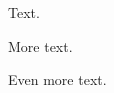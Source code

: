 \documentclass{article}
\begin{document}
\noindent Text.
\begin{code}%
\>[2][@{}l@{\AgdaIndent{1}}]%
\>[4]\AgdaSpace{}%
\AgdaSpace{}%
\AgdaSymbol{:}\AgdaSpace{}%
\<%
\end{code}
More text.
\begin{AgdaMultiCode}{2}
\begin{code}%
%
\>[2]\<%
\end{code}
\begin{code}%
\>[2][@{}l@{\AgdaIndent{1}}]%
\>[4]\AgdaSpace{}%
\AgdaSpace{}%
\AgdaSymbol{:}\AgdaSpace{}%
\<%
\end{code}
\end{AgdaMultiCode}
Even more text.
\end{document}
